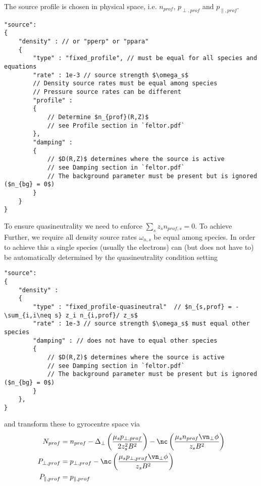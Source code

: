 The source profile is chosen in physical space, i.e. $n_{prof}$, $p_{\perp,prof}$ and $p_{\parallel,prof}$.
\begin{verbatim}
"source":
{
    "density" : // or "pperp" or "ppara"
    {
        "type" : "fixed_profile", // must be equal for all species and equations
        "rate" : 1e-3 // source strength $\omega_s$
        // Density source rates must be equal among species
        // Pressure source rates can be different
        "profile" :
        {
            // Determine $n_{prof}(R,Z)$
            // see Profile section in `feltor.pdf`
        },
        "damping" :
        {
            // $D(R,Z)$ determines where the source is active
            // see Damping section in `feltor.pdf`
            // The background parameter must be present but is ignored ($n_{bg} = 0$)
        }
    }
}
\end{verbatim}
To ensure quasineutrality we need to enforce $\sum_s z_s n_{prof,s} = 0$. To achieve
Further, we require all density source rates $\omega_{n,s}$ be equal among species.
In order to achieve this a single species (usually the electrons) can (but does
not have to) be automatically determined by the quasineutrality condition setting
\begin{verbatim}
"source":
{
    "density" :
    {
        "type" : "fixed_profile-quasineutral"  // $n_{s,prof} = -\sum_{i,i\neq s} z_i n_{i,prof}/ z_s$
        "rate" : 1e-3 // source strength $\omega_s$ must equal other species
        "damping" : // does not have to equal other species
        {
            // $D(R,Z)$ determines where the source is active
            // see Damping section in `feltor.pdf`
            // The background parameter must be present but is ignored ($n_{bg} = 0$)
        }
    },
}
\end{verbatim}
and transform these to gyrocentre space via
\begin{align}
   N_{prof} &= n_{prof} - \Delta_\perp \left( \frac{\mu_s p_{\perp,prof}}{2z_s^2B^2}\right) - \nc\left( \frac{\mu_s n_{prof} \vn_\perp \phi}{z_sB^2}\right) \\
   P_{\perp,prof} &= p_{\perp,prof} - \nc\left( \frac{\mu_s p_{\perp,prof}\vn_\perp \phi}{z_sB^2}\right) \\
   P_{\parallel,prof} &= p_{\parallel,prof}
\end{align}


